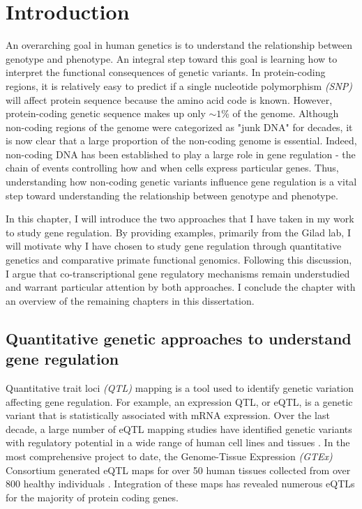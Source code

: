 \chapter{Introduction}

An overarching goal in human genetics is to understand the relationship between genotype and phenotype. An integral step toward this goal is learning how to interpret the functional consequences of genetic variants. In protein-coding regions, it is relatively easy to predict if a single nucleotide polymorphism \emph{(SNP)} will affect protein sequence because the amino acid code is known. However, protein-coding genetic sequence makes up only $\sim1$\% of the genome. Although non-coding regions of the genome were categorized as "junk DNA" for decades, it is now clear that a large proportion of the non-coding genome is essential. Indeed, non-coding DNA has been established to play a large role in gene regulation - the chain of events controlling how and when cells express particular genes. Thus, understanding how non-coding genetic variants influence gene regulation is a vital step toward understanding the relationship between genotype and phenotype. 

In this chapter, I will introduce the two approaches that I have taken in my work to study gene regulation. By providing examples, primarily from the Gilad lab, I will motivate why I have chosen to study gene regulation through quantitative genetics and comparative primate functional genomics. Following this discussion, I argue that co-transcriptional gene regulatory mechanisms remain understudied and warrant particular attention by both approaches. I conclude the chapter with an overview of the remaining chapters in this dissertation.  


\section{Quantitative genetic approaches to understand gene regulation}

Quantitative trait loci \emph{(QTL)} mapping is a tool used to identify genetic variation affecting gene regulation. For example, an expression QTL, or eQTL, is a genetic variant that is statistically associated with mRNA expression.  Over the last decade, a large number of eQTL mapping studies have identified genetic variants with regulatory potential in a wide range of human cell lines and tissues \citep{lappalainen_transcriptome_2013, stranger_population_2007, stranger_population_2007, pickrell_understanding_2010, gtex_consortium_genetic_2017, schmiedel_impact_2018}. In the most comprehensive project to date, the Genome-Tissue Expression \emph{(GTEx)} Consortium generated eQTL maps for over 50 human tissues collected from over 800 healthy individuals \citep{ward_cracking_2017, aguet_gtex_2019, gtex_consortium_genetic_2017}. Integration of these maps has revealed numerous eQTLs for the majority of protein coding genes.  

